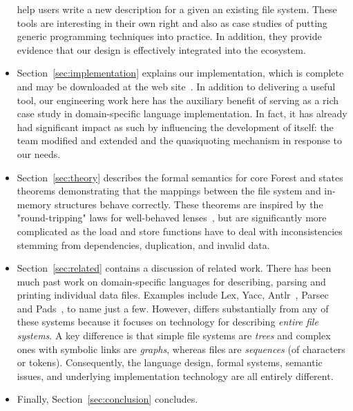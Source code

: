 \begin{itemize}
help users write a new description for a given an existing file system.
These tools are interesting in their
own right and also as case studies of putting generic programming
techniques into practice.  In addition, they provide evidence that
our design is effectively integrated into the
\haskell{} ecosystem.
\item Section~\ref{sec:implementation} explains our implementation,
which is complete and may be downloaded at the \forest{} web 
site~\cite{forest-web-site}.  In addition to delivering a useful tool,
our engineering work here 
has the auxiliary benefit of serving
as a rich case study in domain-specific language implementation. 
In fact, it has already had significant impact as such by influencing the 
development of \haskell{} itself:  
the \haskell{} team modified and extended \template{} and the
quasiquoting mechanism in response to our needs. 

\item Section~\ref{sec:theory} describes the 
formal semantics for core Forest and states
theorems demonstrating that the mappings between the file system and
in-memory structures behave correctly. These theorems are inspired
by the "round-tripping" laws for well-behaved lenses~\cite{lenses}, but are
significantly more complicated as the load and store functions have
to deal with inconsistencies stemming from dependencies,
duplication, and invalid data.
\item Section~\ref{sec:related} contains a discussion of related work.
There has been much past work on domain-specific languages for
describing, parsing and printing individual data files. 
Examples include 
Lex, Yacc,
Antlr~\cite{antlr}, Parsec~\cite{LeijenMeijer:parsec} and 
Pads~\cite{fisher+:toplas}, to name just a few.  
However, \forest{} differs
substantially from any of these systems because it focuses on technology
for describing {\em entire file systems}.  
A key difference is that
simple file systems are {\em trees} and complex ones with symbolic links are 
{\em graphs}, whereas files are {\em sequences} (of characters
or tokens). Consequently,
the language design, formal systems,
semantic issues, and underlying implementation 
technology are all entirely different.  
\item Finally, Section~\ref{sec:conclusion} concludes.
\end{itemize}


